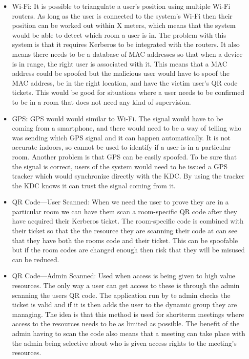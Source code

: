 \documentclass[]{report}   %
\begin{document}
\begin{itemize}

\item Wi-Fi: It is possible to triangulate a user’s position using multiple Wi-Fi routers. As long as the user is connected to the system's Wi-Fi then their position can be worked out within X meters, which means that the system would be able to detect which room a user is in. The problem with this system is that it requires Kerberos to be integrated with the routers. It also means there needs to be a database of MAC addresses so that when a device is in range, the right user is associated with it. This means that a MAC address could be spoofed but the malicious user would have to spoof the MAC address, be in the right location, and have the victim user's QR code tickets. This would be good for situations where a user needs to be confirmed to be in a room that does not need any kind of supervision.

\item GPS: GPS would would similar to Wi-Fi. The signal would have to be coming from a smartphone, and there would need to be a way of telling who was sending which GPS signal and it can happen automatically. It is not accurate indoors, so cannot be used to identify if a user is in a particular room. Another problem is that GPS can be easily spoofed. To be sure that the signal is correct, users of the system would need to be issued a GPS tracker which would synchronize directly with the KDC. By using the tracker the KDC knows it can trust the signal coming from it.

\item QR Code---User Scanned: When we need the user to prove they are in a particular room we can have them scan a room-specific QR code after they have acquired their Kerberos ticket. The room-specific code is combined with their ticket so that the the resource they are scanning their code at can see that they have both the rooms code and their ticket. This can be spoofable but if the room codes are changed enough then risk that they will be misused can be reduced.

\item QR Code---Admin Scanned: Used when access is being given to high value resources. The only way a user can get access to these is through the admin scanning the users QR code. The application run by te admin checks the ticket is valid and if it is then adds the user to the dynamic group they are managing. The idea is that this method is used for shortterm meetings where access to the resources needs to be as limited as possible. The benefit of the admin having to scan the code also means that a meeting can take place with the admin being selective about who is given access rights to the meeting's resources.

\end{itemize}
\end{document}
